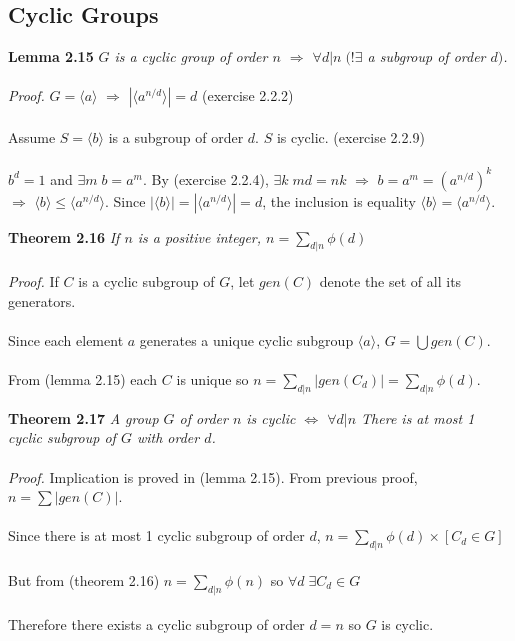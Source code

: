 \documentclass{article}
\begin{document}
\subsection{Cyclic Groups}
\begin{greenrules}\color{OliveGreen}
\textbf{Lemma 2.15} \textit{\(G\) is a cyclic group of order \(n\) \(\Longrightarrow\) \(\forall d|n\;(!\exists\) a subgroup of order \(d)\).}\\\\\color{black}
\textit{Proof.} \(G=\langle a\rangle\) \(\Longrightarrow\) \(|\langle a^{n/d}\rangle|=d\) \color{gray}(exercise 2.2.2)\color{black}\\\\
Assume \(S=\langle b\rangle \) is a subgroup of order \(d\). \(S\) is cyclic. \color{gray}(exercise 2.2.9)\\\\\color{black}
\(b^{d}=1\) and \(\exists m\; b=a^{m}\). By \color{gray}(exercise 2.2.4)\color{black}, \(\exists k\; md=nk\) \(\Longrightarrow\) \(b=a^{m}=(a^{n/d})^{k}\) \(\Longrightarrow\) \(\langle b\rangle \le \langle a^{n/d}\rangle \).
Since \(|\langle b\rangle|=|\langle a^{n/d}\rangle|=d\), the inclusion is equality \(\langle b\rangle =\langle a^{n/d}\rangle \).
\end{greenrules}
\begin{redrules}\color{red}
\textbf{Theorem 2.16} \textit{If \(n\) is a positive integer, \(n=\sum_{d|n}\phi(d)\)\\\\}\color{black}
\textit{Proof.} If \(C\) is a cyclic subgroup of \(G\), let \(gen(C)\) denote the set of all its generators.\\\\
Since each element \(a\) generates a unique cyclic subgroup \(\langle a\rangle \), \(G=\bigcup gen(C)\).\\\\
From \color{gray}(lemma 2.15) \color{black}each \(C\) is unique so \(n=\sum_{d|n}|gen(C_{d})|=\sum_{d|n}\phi(d)\).
\end{redrules}
\begin{redrules}\color{red}
\textbf{Theorem 2.17} \textit{A group \(G\) of order \(n\) is cyclic \(\Longleftrightarrow\) \(\forall d|n\) There is at most 1 cyclic subgroup of \(G\) with order \(d\).}\\\\\color{black}
\textit{Proof.} Implication is proved in \color{gray}(lemma 2.15)\color{black}. From previous proof, \(n=\sum|gen(C)|\).\\\\
Since there is at most 1 cyclic subgroup of order \(d\), \(n=\sum_{d|n}\phi(d)\times [C_{d}\in G]\)\\\\
But from \color{gray}(theorem 2.16) \color{black} \(n=\sum_{d|n}\phi(n)\) so \(\forall d\; \exists C_{d}\in G\)\\\\
Therefore there exists a cyclic subgroup of order \(d=n\) so \(G\) is cyclic.
\end{redrules}
\end{document}
